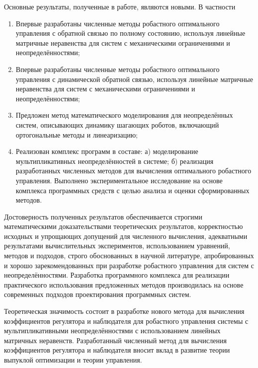 Основные результаты, полученные в работе, являются новыми. В частности
\begin{enumerate}[beginpenalty=10000] %
	\item Впервые разработаны численные методы робастного оптимального управления с обратной связью по полному состоянию, используя линейные матричные неравенства для систем с механическими ограничениями и неопределённостями;
	\item Впервые разработаны численные методы робастного оптимального управления с динамической обратной связью, используя линейные матричные неравенства для систем с механическими ограничениями и неопределённостями;
	\item Предложен метод математического моделирования для неопределённых систем, описывающих динамику шагающих роботов, включающий ортогональные методы и линеаризацию;
	\item Реализован комплекс программ в составе: а) моделирование мультипликативных неопределённостей в системе; б) реализация разработанных численных методов для вычисления оптимального робастного управления. Выполнено экспериментальное исследование на основе комплекса программных средств с целью анализа и оценки сформированных методов.
\end{enumerate}

{\probation}

Достоверность полученных результатов обеспечивается строгими математическими доказательствами теоретических результатов, корректностью исходных и упрощающих допущений для численного вычисления, адекватными результатами вычислительных экспериментов, использованием уравнений, методов и подходов, строго обоснованных в научной литературе, апробированных и хорошо зарекомендованных при разработке робастного управления для систем с неопределённостями. Разработка программного комплекса для реализации практического использования предложенных методов производилась на основе современных подходов проектирования программных систем.

{\influence} 

Теоретическая значимость состоит в разработке нового метода для вычисления коэффициентов регулятора и наблюдателя для робастного управления системы с мультипликативными неопределённостями с использованием линейных матричных неравенств. Разработанный численный метод для вычисления коэффициентов регулятора и наблюдателя вносит вклад в развитие теории выпуклой оптимизации и теории управления.

